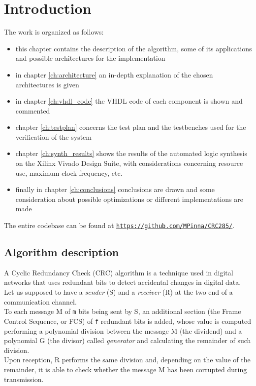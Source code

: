 %
\chapter{Introduction}\label{ch:introduction}
The work is organized as follows:
\begin{itemize}
	\item this chapter contains the description of the algorithm, some of its applications and possible architectures for the implementation
	\item in chapter \ref{ch:architecture} an in-depth explanation of the chosen architectures is given
	\item in chapter \ref{ch:vhdl_code} the VHDL code of each component is shown and commented
	\item chapter \ref{ch:testplan} concerns the test plan and the testbenches used for the verification of the system
	\item chapter \ref{ch:synth_results} shows the results of the automated logic synthesis on the Xilinx Vivado Design Suite, with considerations concerning resource use, maximum clock frequency, etc.
	\item finally in chapter \ref{ch:conclusions} conclusions are drawn and some consideration about possible optimizations or different implementations are made
\end{itemize}

The entire codebase can be found at \texttt{\href{https://github.com/MPinna/CRC285/}{https://github.com/MPinna/CRC285/}}.

\section{Algorithm description}\label{sec:alg_description}
A Cyclic Redundancy Check (CRC) algorithm is a technique used in digital networks that uses redundant bits to detect accidental changes in digital data.\\
Let us supposed to have a \textit{sender} (S) and a \textit{receiver} (R) at the two end of a communication channel.\\
To each message M of \texttt{m} bits being sent by S, an additional section (the Frame Control Sequence, or FCS) of \texttt{f} redundant bits is added, whose value is computed performing a polynomial division between the message M (the dividend) and a polynomial G (the divisor) called \textit{generator} and calculating the remainder of such division.\\
Upon reception, R performs the same division and, depending on the value of the remainder, it is able to check whether the message M has been corrupted during transmission.\\

